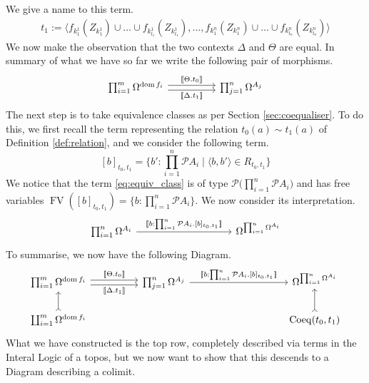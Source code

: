\documentclass{birkjour}
\theoremstyle{plain}
\theoremstyle{definition}
\newcommand{\call}[1]{\mathcal{#1}}
\begin{document}
	We give a name to this term.
	\begin{align*}
		t_1 := \langle f_{k_1^1}(Z_{k_1^1}) \cup \hdots \cup f_{k_{l_1}^1}(Z_{k_{l_1}^1}),...,f_{k_1^n}(Z_{k_1^n}) \cup \hdots \cup f_{k_{l_n}^n}(Z_{k_{l_n}^n})\rangle
	\end{align*}
	We now make the observation that the two contexts $\Delta$ and $\Theta$ are equal. In summary of what we have so far we write the following pair of morphisms.
	\begin{equation}
		\begin{tikzcd}
			\prod_{i = 1}^m \Omega^{\operatorname{dom}f_i}\arrow[rr,shift left, "{\llbracket\Theta.  t_0\rrbracket}"]\arrow[rr,swap,shift right,"{\llbracket \Delta. t_1\rrbracket}"] & & \prod_{j = 1}^n\Omega^{A_j} 
		\end{tikzcd}
	\end{equation}
	The next step is to take equivalence classes as per Section \ref{sec:coequaliser}. To do this, we first recall the term representing the relation $t_0(a) \sim t_1(a)$ of Definition \ref{def:relation}, and we consider the following term.
	\begin{equation}\label{eq:equiv_class}
		[b]_{t_0,t_1} = \Big\lbrace b':\prod_{i = 1}^n \call{P}A_i \mid \langle b,b'\rangle \in R_{t_0,t_1}\Big\rbrace
	\end{equation}
	We notice that the term \eqref{eq:equiv_class} is of type $\call{P}\big(\prod_{i = 1}^n \call{P}A_i\big)$ and has free variables $\operatorname{FV}([b]_{t_0,t_1}) = \lbrace b: \prod_{i = 1}^n \call{P}A_i\rbrace$. We now consider its interpretation.
	\begin{equation}
		\begin{tikzcd}[column sep = huge]
			\prod_{i =1 }^n \Omega^{A_i}\arrow[rr,"{\llbracket b:\prod_{i = 1}^n \call{P}A_i. [b]_{t_0,t_1} \rrbracket}"] & & \Omega^{\prod_{i = 1}^n \Omega^{A_i}}
		\end{tikzcd}
	\end{equation}
	To summarise, we now have the following Diagram.
	\begin{equation}\label{eq:colimit_parent}
		\begin{tikzcd}[column sep = huge]
			\prod_{i = 1}^m \Omega^{\operatorname{dom}f_i}\arrow[r,shift left, "{\llbracket\Theta.  t_0 \rrbracket}"]\arrow[r,swap,shift right,"{\llbracket \Delta. t_1\rrbracket}"]& \prod_{j = 1}^n\Omega^{A_j} \arrow[rr,"{\llbracket b:\prod_{i = 1}^n \call{P}A_i. [b]_{t_0,t_1} \rrbracket}"] & & \Omega^{\prod_{i = 1}^n \Omega^{A_i}}\\
			\coprod_{i = 1}^m \Omega^{\operatorname{dom}f_i}\arrow[u,rightarrowtail] & & & \operatorname{Coeq}(t_0,t_1)\arrow[u,rightarrowtail]
		\end{tikzcd}
	\end{equation}
	What we have constructed is the top row, completely described via terms in the Interal Logic of a topos, but we now want to show that this descends to a Diagram describing a colimit.
	
\end{document}
